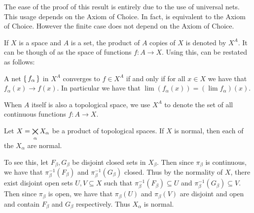 \documentclass[letterpaper, 11pt, oneside]{book}
\begin{document}
The ease of the proof of this result is entirely due to the use of universal nets.
This usage depends on the Axiom of Choice.
In fact,  is equivalent to the Axiom of Choice.
However the finite case  does not depend on the Axiom of Choice.

If $X$ is a space and $A$ is a set, the product of $A$ copies of $X$ is denoted by $X^{A}$.
It can be though of as the space of functions $f\colon A \to X$.
Using this,  can be restated as follows:
\begin{prop}
  A net $\set{f_{\alpha}}$ in $X^{A}$ converges to $f \in X^{A}$ if and only if for all $x \in X$ we have that $f_{\alpha}(x) \to f(x)$.
  In particular we have that $\lim(f_{\alpha}(x)) = (\lim f_{\alpha})(x)$.
\end{prop}

When $A$ itself is also a topological space, we use $X^{A}$ to denote the set of all continuous functions $f\colon A \to X$.

\begin{prop}
  Let $X = \bigtimes\limits_{\alpha} X_{\alpha}$ be a product of topological spaces.
  If $X$ is normal, then each of the $X_{\alpha}$ are normal.

\end{prop}
\begin{pf}
  To see this, let $F_{\beta}, G_{\beta}$ be disjoint closed sets in $X_{\beta}$.
  Then since $\pi_{\beta}$ is continuous, we have that $\pi_{\beta}^{-1}(F_{\beta})$ and $\pi_{\beta}^{-1}(G_{\beta})$ closed.
  Thus by the normality of $X$, there exist disjoint open sets $U, V \subseteq X$ such that $\pi_{\beta}^{-1}(F_{\beta}) \subseteq U$ and $\pi_{\beta}^{-1}(G_{\beta}) \subseteq V$.
  Then since $\pi_{\beta}$ is open, we have that $\pi_{\beta}(U)$ and $\pi_{\beta}(V)$ are disjoint and open and contain $F_{\beta}$ and $G_{\beta}$ respectively.
  Thus $X_{\alpha}$ is normal.
\end{pf}

\clearpage
\end{document}
